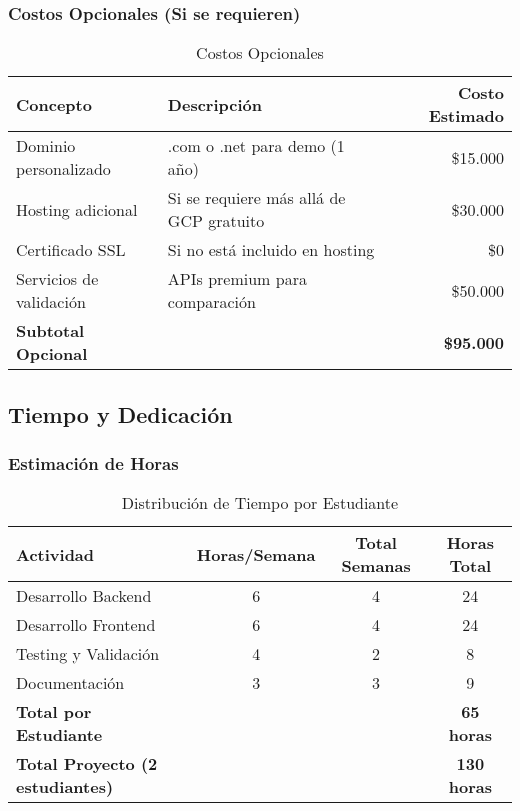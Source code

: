 \subsubsection{Costos Opcionales (Si se requieren)}

\begin{table}[H]
    \centering
    \small
    \begin{tabular}{|l|l|r|}
        \hline
        \textbf{Concepto} & \textbf{Descripción} & \textbf{Costo Estimado} \\
        \hline
        Dominio personalizado & .com o .net para demo (1 año) & \$15.000 \\
        \hline
        Hosting adicional & Si se requiere más allá de GCP gratuito & \$30.000 \\
        \hline
        Certificado SSL & Si no está incluido en hosting & \$0 \\
        \hline
        Servicios de validación & APIs premium para comparación & \$50.000 \\
        \hline
        \textbf{Subtotal Opcional} & & \textbf{\$95.000} \\
        \hline
    \end{tabular}
    \caption{Costos Opcionales}
    \label{tab:costos_opcionales}
\end{table}

\subsection{Tiempo y Dedicación}

\subsubsection{Estimación de Horas}

\begin{table}[H]
    \centering
    \small
    \begin{tabular}{|l|c|c|c|}
        \hline
        \textbf{Actividad} & \textbf{Horas/Semana} & \textbf{Total Semanas} & \textbf{Horas Total} \\
        \hline
        Desarrollo Backend & 6 & 4 & 24 \\
        \hline
        Desarrollo Frontend & 6 & 4 & 24 \\
        \hline
        Testing y Validación & 4 & 2 & 8 \\
        \hline
        Documentación & 3 & 3 & 9 \\
        \hline
        \textbf{Total por Estudiante} & & & \textbf{65 horas} \\
        \hline
        \textbf{Total Proyecto (2 estudiantes)} & & & \textbf{130 horas} \\
        \hline
    \end{tabular}
    \caption{Distribución de Tiempo por Estudiante}
    \label{tab:tiempo_estudiantes}
\end{table}

